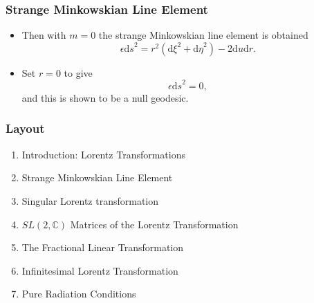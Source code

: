 \documentclass[10pt,a4paper]{beamer}
\begin{document}
\begin{frame}
\frametitle{Strange Minkowskian Line Element}
\begin{itemize}
\item<1->{Then with $m = 0$ the strange Minkowskian line element is obtained $$\epsilon {\mathrm{d}s}^2 = r^2 ({\mathrm{d}\xi}^2 + {\mathrm{d}\eta}^2) - 2 {\mathrm{d}u}{\mathrm{d}r}.$$}
\item<2->{Set $r = 0$ to give $$\epsilon {\mathrm{d}s}^2 = 0,$$ and this is shown to be a null geodesic.}
\end{itemize}
\end{frame}

\begin{frame}
\frametitle{Layout}
\begin{enumerate}
\item<1>{Introduction: Lorentz Transformations}
\item<1>{Strange Minkowskian Line Element}
\item<1>{Singular Lorentz transformation}
\item<0>{$SL(2,\mathbb{C})$ Matrices of the Lorentz Transformation}
\item<0>{The Fractional Linear Transformation}
\item<0>{Infinitesimal Lorentz Transformation}
\item<0>{Pure Radiation Conditions}
\end{enumerate}
\end{frame}

\end{document}
